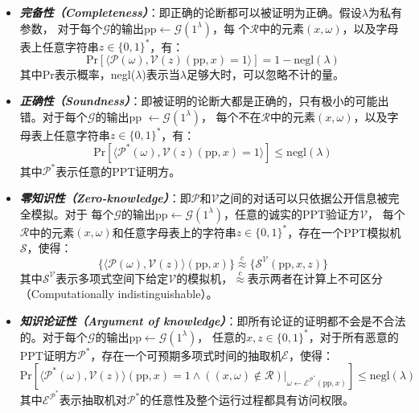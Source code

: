 \documentclass[zihao=-4]{ctexart}
\begin{document}
\begin{itemize}
  \item \textbf{\emph{完备性（Completeness）}}：即正确的论断都可以被证明为正确。假设$\lambda$为私有参数，
      对于每个$\mathcal{G}$的输出pp$\leftarrow\mathcal{G}(1^{\lambda})$，每
      个$\mathcal{R}$中的元素$(x,\omega)$，以及字母表上任意字符串$z\in\{0,1\}^*$，有：
      \[\text{Pr}[\langle \mathcal{P}({\omega}),\mathcal{V}(z)(\text{pp},x)=1\rangle]=1-\text{negl}(\lambda)\]
      其中Pr表示概率，negl($\lambda$)表示当$\lambda$足够大时，可以忽略不计的量。
  \item \textbf{\emph{正确性（Soundness）}}：即被证明的论断大都是正确的，只有极小的可能出错。对于每个$\mathcal{G}$的输出pp
      $\leftarrow\mathcal{G}(1^{\lambda})$，
      每个不在$\mathcal{R}$中的元素$(x,\omega)$，以及字母表上任意字符串$z\in\{0,1\}^*$，有：
      \[\text{Pr}[\langle \mathcal{P}^*({\omega}),\mathcal{V}(z)(\text{pp},x)=1\rangle]\le\text{negl}(\lambda)\]
      其中$\mathcal{P}^*$表示任意的PPT证明方。
  \item \textbf{\emph{零知识性（Zero-knowledge）}}：即$\mathcal{P}$和$\mathcal{V}$之间的对话可以只依据公开信息被完全模拟。对于
      每个$\mathcal{G}$的输出pp$\leftarrow\mathcal{G}(1^{\lambda})$，任意的诚实的PPT验证方$\mathcal{V}$，
      每个$\mathcal{R}$中的元素$(x,\omega)$和任意字母表上的字符串$z\in\{0,1\}^*$，存在一个PPT模拟机$\mathcal{S}$，使得：
      \[\{\langle \mathcal{P}(\omega),\mathcal{V}(z)\rangle(\text{pp},x)\}\overset{c}{\approx}\{\mathcal{S}^{\mathcal{V}}(\text{pp},x,z)\}\]
      其中$\mathcal{S}^{\mathcal{V}}$表示多项式空间下给定$\mathcal{V}$的模拟机，$\overset{c}{\approx}$表示两者在计算上不可区分
      （Computationally indistinguishable）。
  \item \textbf{\emph{知识论证性（Argument of knowledge）}}：即所有论证的证明都不会是不合法的。对于每个$\mathcal{G}$的输出pp$\leftarrow\mathcal{G}(1^{\lambda})$，
      任意的$x,z\in\{0,1\}^*$，对于所有恶意的PPT证明方$\mathcal{P^*}$，存在一个可预期多项式时间的抽取机$\mathcal{E}$，使得：
      \[\text{Pr}[\langle \mathcal{P^*}(\omega),\mathcal{V}(z)\rangle(\text{pp},x)=1\wedge((x,\omega)\not\in\mathcal{R})|_{\omega\leftarrow\mathcal{E}^{\mathcal{P^*}}(\text{pp},x)}]\le\text{negl}(\lambda)\]
      其中$\mathcal{E}^{\mathcal{P}^*}$表示抽取机对$\mathcal{P^*}$的任意性及整个运行过程都具有访问权限。
\end{itemize}
\end{document}
